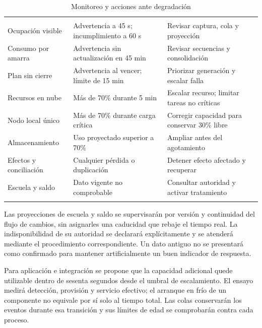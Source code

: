 \begingroup
\setlength{\tabcolsep}{3pt}
\begin{longtable}{@{}L{.28\textwidth}L{.30\textwidth}L{\dimexpr.42\textwidth-12pt\relax}@{}}
\caption{Monitoreo y acciones ante degradación}\label{tab:sd5_monitoreo}\\
\hline
{} &  &  \\ \hline
\endfirsthead
\hline
{} &  &  \\ \hline
\endhead
Ocupación visible & Advertencia a 45 s; incumplimiento a 60 s & Revisar captura, cola y proyección \\ \addlinespace \hline
Consumo por amarra & Advertencia sin actualización en 45 min & Revisar secuencias y consolidación \\ \addlinespace \hline
Plan sin cierre & Advertencia al vencer; límite de 15 min & Priorizar generación y escalar falla \\ \addlinespace \hline
Recursos en nube & Más de 70\% durante 5 min & Escalar recurso; limitar tareas no críticas \\ \addlinespace \hline
Nodo local único & Más de 70\% durante carga crítica & Corregir capacidad para conservar 30\% libre \\ \addlinespace \hline
Almacenamiento & Uso proyectado superior a 70\% & Ampliar antes del agotamiento \\ \addlinespace \hline
Efectos y conciliación & Cualquier pérdida o duplicación & Detener efecto afectado y recuperar \\ \addlinespace \hline
Escuela y saldo & Dato vigente no comprobable & Consultar autoridad y activar tratamiento \\ \addlinespace \hline
\end{longtable}
\endgroup

Las proyecciones de escuela y saldo se supervisarán por versión y continuidad del flujo de cambios, sin asignarles una caducidad que rebaje el tiempo real. La indisponibilidad de su autoridad se declarará explícitamente y se atenderá mediante el procedimiento correspondiente. Un dato antiguo no se presentará como confirmado para mantener artificialmente un buen indicador de respuesta.

Para aplicación e integración se propone que la capacidad adicional quede utilizable dentro de sesenta segundos desde el umbral de escalamiento. El ensayo medirá detección, provisión y servicio efectivo; el arranque en frío de un componente no equivale por sí solo al tiempo total. Las colas conservarán los eventos durante esa transición y sus límites de edad se comprobarán contra cada proceso.

